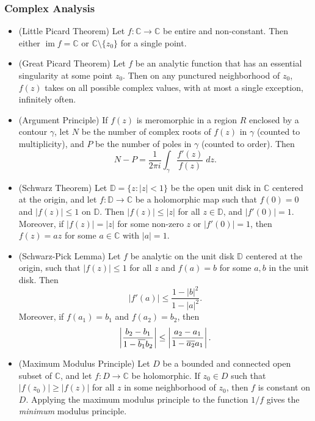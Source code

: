 \documentclass{article}
\begin{document}
	\subsubsection{Complex Analysis}
	\begin{itemize}
		\item (Little Picard Theorem) Let $f: \mathbb{C}\to \mathbb{C}$ be entire and non-constant. Then either $\operatorname{im}{f} = \mathbb{C}$ or $\mathbb{C}\setminus \{z_0\}$ for a single point. 
		\item (Great Picard Theorem) Let $f$ be an analytic function that has an essential singularity at some point $z_{0}$. Then on any punctured neighborhood of $z_{0}$, $f(z)$ takes on all possible complex values, with at most a single exception, infinitely often. 
		\item (Argument Principle) If $f(z)$ is meromorphic in a region $R$ enclosed by a contour $\gamma$, let $N$ be the number of complex roots of $f(z)$ in $\gamma$ (counted to multiplicity), and $P$ be the number of poles in $\gamma$ (counted to order). Then 
		\begin{equation*}
			N - P = \frac{1}{2\pi i}\int_{\gamma}\frac{f'(z)}{f(z)}\;dz. 
		\end{equation*}
		\item (Schwarz Theorem) Let $\mathbb{D} = \{z: |z| < 1\}$ be the open unit disk in $\mathbb{C}$ centered at the origin, and let $f: \mathbb{D} \to \mathbb{C}$ be a holomorphic map such that $f(0) = 0$ and $|f(z)|\leq 1$ on $\mathbb{D}$. Then $|f(z)| \leq |z|$ for all $z \in \mathbb{D}$, and $|f'(0)| = 1$. Moreover, if $|f(z)| = |z|$ for some non-zero $z$ or $|f'(0)| = 1$, then $f(z) = az$ for some $a \in \mathbb{C}$ with $|a| = 1$. 
		\item (Schwarz-Pick Lemma) Let $f$ be analytic on the unit disk $\mathbb{D}$ centered at the origin, such that $|f(z)| \leq 1$ for all $z$ and $f(a) = b$ for some $a, b$ in the unit disk. Then 
		\begin{equation*}
			|f'(a)| \leq \frac{1 - |b|^{2}}{1 - |a|^{2}}. 
		\end{equation*}
		Moreover, if $f(a_{1})= b_{1}$ and $f(a_{2}) = b_{2}$, then 
		\begin{equation*}
			\left| \frac{b_{2} - b_{1}}{1 - \overline{b_{1}}b_{2}} \right| \leq \left| \frac{a_{2}- a_{1}}{1 - \overline{a_{2}}a_{1}} \right|. 
		\end{equation*}
		\item (Maximum Modulus Principle) Let $D$ be a bounded and connected open subset of $\mathbb{C}$, and let $f: D \to \mathbb{C}$ be holomorphic. If $z_{0} \in D$ such that $|f(z_{0})| \geq |f(z)|$ for all $z$ in some neighborhood of $z_{0}$, then $f$ is constant on $D$. Applying the maximum modulus principle to the function $1/f$ gives the \textit{minimum} modulus principle. 

\end{itemize}
\end{document}
